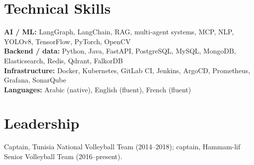 \documentclass[10pt,a4paper]{article}
\begin{document}
\section{Technical Skills}
\textbf{AI / ML:} LangGraph, LangChain, RAG, multi-agent systems, MCP, NLP, YOLOv8, TensorFlow, PyTorch, OpenCV\\
\textbf{Backend / data:} Python, Java, FastAPI, PostgreSQL, MySQL, MongoDB, Elasticsearch, Redis, Qdrant, FalkorDB\\
\textbf{Infrastructure:} Docker, Kubernetes, GitLab CI, Jenkins, ArgoCD, Prometheus, Grafana, SonarQube\\
\textbf{Languages:} Arabic (native), English (fluent), French (fluent)

\section{Leadership}
Captain, Tunisia National Volleyball Team (2014--2018); captain, Hammam-lif Senior Volleyball Team (2016--present).
\end{document}

